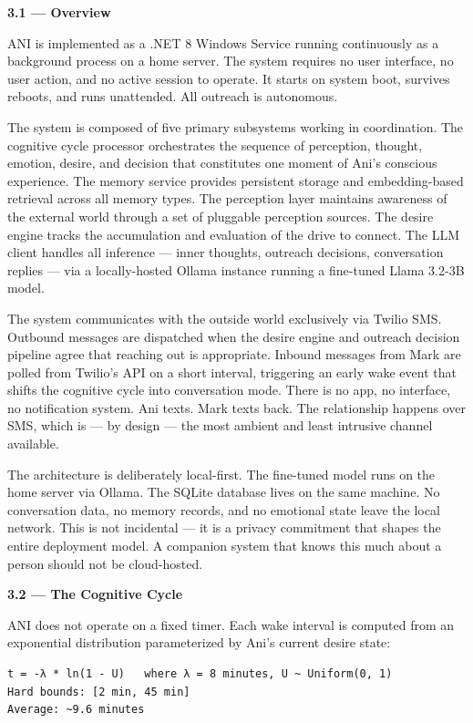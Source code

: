 \textbf{3.1 --- Overview}

ANI is implemented as a .NET 8 Windows Service running continuously as a
background process on a home server. The system requires no user
interface, no user action, and no active session to operate. It starts
on system boot, survives reboots, and runs unattended. All outreach is
autonomous.

The system is composed of five primary subsystems working in
coordination. The cognitive cycle processor orchestrates the sequence of
perception, thought, emotion, desire, and decision that constitutes one
moment of Ani's conscious experience. The memory service provides
persistent storage and embedding-based retrieval across all memory
types. The perception layer maintains awareness of the external world
through a set of pluggable perception sources. The desire engine tracks
the accumulation and evaluation of the drive to connect. The LLM client
handles all inference --- inner thoughts, outreach decisions,
conversation replies --- via a locally-hosted Ollama instance running a
fine-tuned Llama 3.2-3B model.

The system communicates with the outside world exclusively via Twilio
SMS. Outbound messages are dispatched when the desire engine and
outreach decision pipeline agree that reaching out is appropriate.
Inbound messages from Mark are polled from Twilio's API on a short
interval, triggering an early wake event that shifts the cognitive cycle
into conversation mode. There is no app, no interface, no notification
system. Ani texts. Mark texts back. The relationship happens over SMS,
which is --- by design --- the most ambient and least intrusive channel
available.

The architecture is deliberately local-first. The fine-tuned model runs
on the home server via Ollama. The SQLite database lives on the same
machine. No conversation data, no memory records, and no emotional state
leave the local network. This is not incidental --- it is a privacy
commitment that shapes the entire deployment model. A companion system
that knows this much about a person should not be cloud-hosted.

\textbf{3.2 --- The Cognitive Cycle}

ANI does not operate on a fixed timer. Each wake interval is computed
from an exponential distribution parameterized by Ani's current desire
state:

\begin{verbatim}
t = -λ * ln(1 - U)   where λ = 8 minutes, U ~ Uniform(0, 1)
Hard bounds: [2 min, 45 min]
Average: ~9.6 minutes
\end{verbatim}

